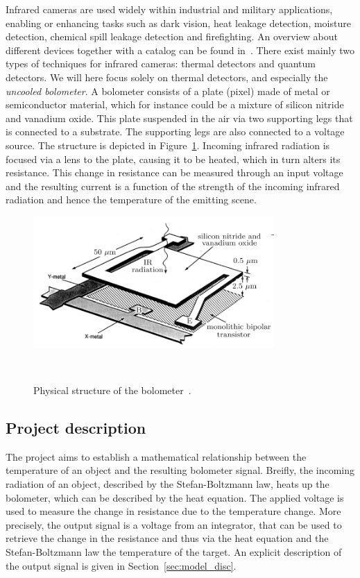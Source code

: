 Infrared cameras are used widely within industrial and military
applications, enabling or enhancing tasks such as dark vision, heat
leakage detection, moisture detection, chemical spill leakage
detection and firefighting. An overview about different devices
together with a catalog can be found in~\cite{flir_handbook}. There
exist mainly two types of techniques for infrared cameras: thermal
detectors and quantum detectors. We will here focus solely on thermal
detectors, and especially the \textit{uncooled bolometer}. A bolometer consists of a plate (pixel)
made of metal or semiconductor material, which for instance could be a mixture of
silicon nitride and vanadium oxide. This plate suspended in the air
via two supporting legs that is connected to a substrate. The
supporting legs are also connected to a voltage
source. The structure is depicted in Figure~\ref{fig:structure}. Incoming infrared radiation is focused via a lens to the
plate, causing it to be heated, which in turn alters its
resistance. This change in resistance can be measured through an
input voltage and the resulting current is a function of the strength
of the incoming infrared radiation and hence
the temperature of the emitting scene.

\begin{figure}[h]
\begin{center}
\includegraphics[height=5cm]{gfx/pixel1.png}
\caption{Physical structure of the bolometer~\cite{xiu2010research}.}~\label{fig:structure}
\end{center}
\end{figure}

\subsection{Project description}

The project aims to establish a mathematical relationship between the
temperature of an object and the resulting bolometer signal. Breifly,
the incoming radiation of an object, described by the Stefan-Boltzmann
law, heats up the bolometer, which can be described by the heat
equation. The applied voltage is used to measure the change in
resistance due to the temperature change. More precisely, the
output signal is a voltage from an integrator, that can be used to
retrieve the change in the resistance and thus via the heat equation
and the Stefan-Boltzmann law the temperature of the target. An explicit
description of the output signal is given in
Section~\ref{sec:model_disc}.


